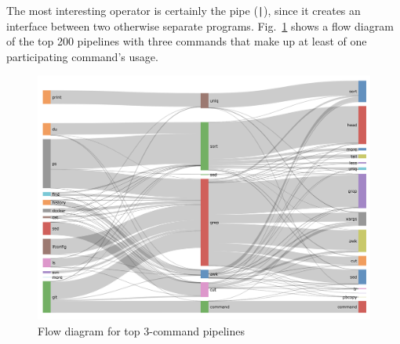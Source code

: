 
The most interesting operator is certainly the pipe (\verb!|!), since it creates an interface between two otherwise separate programs.
Fig.~\ref{fig:flow} shows a flow diagram of the top 200 pipelines with three commands that make up at least  of one participating command's usage.

\begin{figure}[h]
	\centering    
	\includegraphics[width=0.76\linewidth]{flow.png}
	\caption{Flow diagram for top 3-command pipelines}
	\label{fig:flow}
\end{figure}
